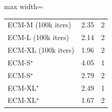 \begin{table}[t!]
\begin{minipage}[t]{0.49\linewidth}
\begin{adjustbox}{max width=\textwidth}
\begin{tabular}{@{}lcc@{}}
ECM-M (100k iters) & 2.35 & 2 \\
ECM-L (100k iters) & 2.14 & 2 \\
ECM-XL (100k iters) & 1.96 & 2 \\
\midrule
ECM-S$^\star$  & 4.05  & 1 \\
ECM-S$^\star$  & 2.79  & 2 \\
ECM-XL$^\star$ & 2.49  & 1 \\
ECM-XL$^\star$ & 1.67  & 2 \\
\bottomrule
\end{tabular}
\end{adjustbox}
\end{minipage}

\label{table:ect-cifar10-imagenet64}
\vspace{-10pt}
\end{table}